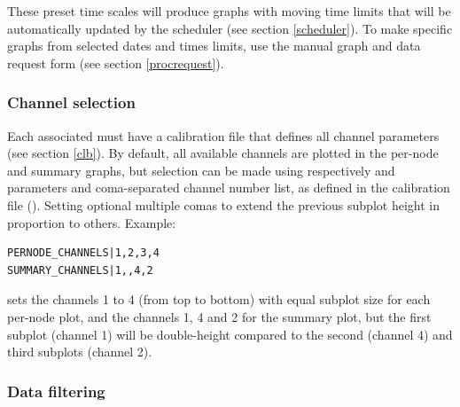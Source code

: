 These preset time scales will produce graphs with moving time limits that will be automatically updated by the scheduler (see section \ref{scheduler}). To make specific graphs from selected dates and times limits, use the manual  graph and data request form (see section \ref{procrequest}).

\subsubsection{Channel selection}

Each associated  must have a calibration file that defines all channel parameters (see section \ref{clb}).
By default, all available channels are plotted in the per-node and summary graphs, but selection can be made using respectively  and  parameters and coma-separated channel number list, as defined in the calibration file (). Setting optional multiple comas to extend the previous subplot height in proportion to others. Example:

\begin{lstlisting}
PERNODE_CHANNELS|1,2,3,4
SUMMARY_CHANNELS|1,,4,2
\end{lstlisting}

sets the channels 1 to 4 (from top to bottom) with equal subplot size for each per-node plot, and the channels 1, 4 and 2 for the summary plot, but the first subplot (channel 1) will be double-height compared to the second (channel 4) and third subplots (channel 2).


\subsubsection{Data filtering}

